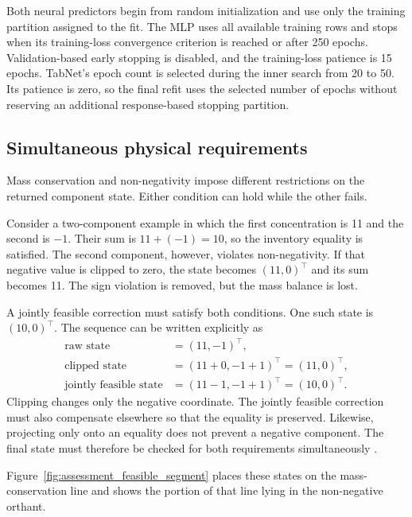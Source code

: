 Both neural predictors begin from random initialization and use only the training partition assigned to the fit. The MLP uses all available training rows and stops when its training-loss convergence criterion is reached or after 250 epochs. Validation-based early stopping is disabled, and the training-loss patience is 15 epochs. TabNet's epoch count is selected during the inner search from 20 to 50. Its patience is zero, so the final refit uses the selected number of epochs without reserving an additional response-based stopping partition.

\subsection{Simultaneous physical requirements}

Mass conservation and non-negativity impose different restrictions on the returned component state. Either condition can hold while the other fails.

Consider a two-component example in which the first concentration is 11 and the second is $-1$. Their sum is
$11+(-1)=10$, so the inventory equality is satisfied. The second component, however, violates non-negativity. If that negative value is clipped to zero, the state becomes $(11,0)^\top$ and its sum becomes 11. The sign violation is removed, but the mass balance is lost.

A jointly feasible correction must satisfy both conditions. One such state is $(10,0)^\top$. The sequence can be written explicitly as
\[
\begin{aligned}
\text{raw state}&=(11,-1)^\top,\\
\text{clipped state}&=(11+0,-1+1)^\top=(11,0)^\top,\\
\text{jointly feasible state}&=(11-1,-1+1)^\top=(10,0)^\top.
\end{aligned}
\]
Clipping changes only the negative coordinate. The jointly feasible correction must also compensate elsewhere so that the equality is preserved. Likewise, projecting only onto an equality does not prevent a negative component. The final state must therefore be checked for both requirements simultaneously \citep{KircherVotsmeier2025,Haddad2010}.

Figure~\ref{fig:assessment_feasible_segment} places these states on the mass-conservation line and shows the portion of that line lying in the non-negative orthant.

